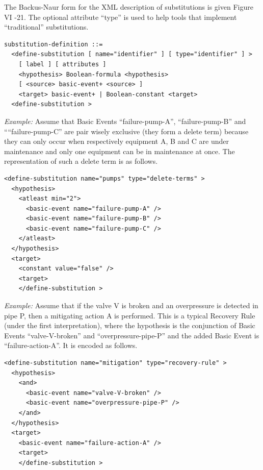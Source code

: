 \documentclass[11pt]{article}
\begin{document}
The Backus-Naur form for the XML description of substitutions is given
Figure VI -21. The optional attribute ``type'' is used to help tools that
implement ``traditional'' substitutions.

\begin{lstlisting}
substitution-definition ::=
  <define-substitution [ name="identifier" ] [ type="identifier" ] >
    [ label ] [ attributes ]
    <hypothesis> Boolean-formula <hypothesis>
    [ <source> basic-event+ <source> ]
    <target> basic-event+ | Boolean-constant <target>
  <define-substitution >
\end{lstlisting}



\emph{Example:} Assume that Basic Events ``failure-pump-A'', ``failure-pump-B''
and ````failure-pump-C'' are pair wisely exclusive (they form a delete
term) because they can only occur when respectively equipment A, B and C
are under maintenance and only one equipment can be in maintenance at
once. The representation of such a delete term is as follows.


\lstset{language=XML,label= ,caption= ,captionpos=b,numbers=none}
\begin{lstlisting}
<define-substitution name="pumps" type="delete-terms" >
  <hypothesis>
    <atleast min="2">
      <basic-event name="failure-pump-A" />
      <basic-event name="failure-pump-B" />
      <basic-event name="failure-pump-C" />
    </atleast>
  </hypothesis>
  <target>
    <constant value="false" />
    <target>
    </define-substitution >
\end{lstlisting}

\emph{Example:} Assume that if the valve V is broken and an overpressure is
detected in pipe P, then a mitigating action A is performed. This is a
typical Recovery Rule (under the first interpretation), where the
hypothesis is the conjunction of Basic Events ``valve-V-broken'' and
``overpressure-pipe-P'' and the added Basic Event is ``failure-action-A''.
It is encoded as follows.


\lstset{language=XML,label= ,caption= ,captionpos=b,numbers=none}
\begin{lstlisting}
<define-substitution name="mitigation" type="recovery-rule" >
  <hypothesis>
    <and>
      <basic-event name="valve-V-broken" />
      <basic-event name="overpressure-pipe-P" />
    </and>
  </hypothesis>
  <target>
    <basic-event name="failure-action-A" />
    <target>
    </define-substitution >
\end{lstlisting}
\end{document}
